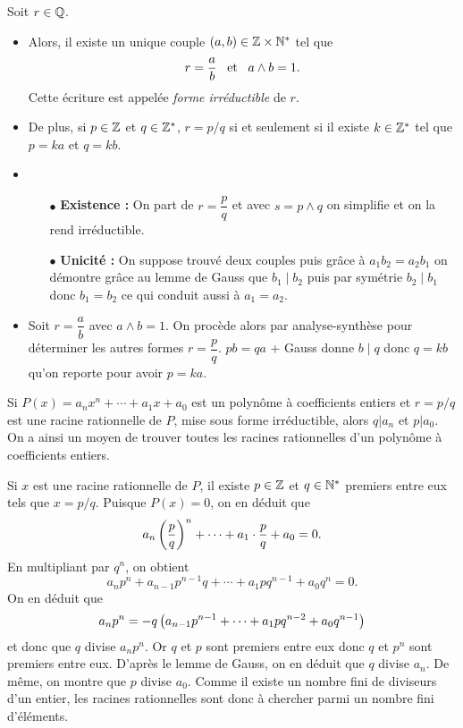 \documentclass{magnolia}
\begin{document}
\begin{proposition}
Soit $r\in\mathbb{Q}$.
\begin{itemize}
\item Alors, il existe un unique couple $\left(a,b\right)\in\mathbb{Z}\times{\mathbb{N}^*}$ tel que
  \[r=\frac{a}{b} \quad\!\text{et}\quad\! a\wedge b=1.\]
  Cette écriture est appelée \emph{forme irréductible} de $r$.
\item De plus, si $p\in\mathbb{Z}$ et $q\in\mathbb{Z}^*$, $r=p/q$ si et seulement si il existe
  $k\in\mathbb{Z}^*$ tel que $p=ka$ et $q=kb$.
\end{itemize}
\end{proposition}

\begin{preuve}
\begin{itemize}
\item \begin{itemize}
\item[$\bullet$] \textbf{Existence :} On part de $r=\dfrac{p}{q}$ et avec $s=p\wedge q$ on simplifie et on la rend irréductible.
\item[$\bullet$] \textbf{Unicité :} On suppose trouvé deux couples puis grâce à $a_1b_2=a_2b_1$ on démontre grâce au lemme de Gauss que $b_1\mid b_2$ puis par symétrie $b_2\mid b_1$ donc $b_1=b_2$ ce qui conduit aussi à $a_1=a_2$.
\end{itemize}
\item Soit $r=\dfrac{a}{b}$ avec $a\wedge b=1$. On procède alors par analyse-synthèse pour déterminer les autres formes $r=\dfrac{p}{q}$. $pb=qa$ + Gauss donne $b\mid q$ donc $q=kb$ qu'on reporte pour avoir $p=ka$.
\end{itemize}

\end{preuve}

\begin{remarqueUnique}
\remarque Si $P(x)=a_n x^n+\cdots+a_1 x+a_0$ est un polynôme à coefficients
  entiers et $r=p/q$ est une racine rationnelle de $P$, mise sous
  forme irréductible, alors $q|a_n$ et $p|a_0$. On a ainsi un moyen de trouver
  toutes les racines rationnelles d'un polynôme à coefficients entiers.
\end{remarqueUnique}

\begin{sol}
Si $x$ est une racine rationnelle de $P$, il existe $p\in\mathbb{Z}$ et $q\in{\mathbb{N}^*}$ premiers entre eux tels que $x=p/q$. Puisque $P(x)=0$, on en déduit que
\[a_n\left(\frac{p}{q}\right)^n+\cdots+a_1\cdot\frac{p}{q}+a_0=0.\]
En multipliant par $q^n$, on obtient
\[a_n p^n + a_{n-1}p^{n-1}q+\cdots+a_1 p q^{n-1}+a_0 q^n=0.\]
On en déduit que
\[a_n p^n = -q\left(a_{n-1}p^{n-1}+\cdots+a_1 p q^{n-2}+a_0 q^{n-1}\right)\]
et donc que $q$ divise $a_n p^n$. Or $q$ et $p$ sont premiers entre eux donc $q$ et $p^n$ sont premiers entre eux. D'après le lemme de {\sc Gauss}, on en déduit que $q$ divise $a_n$. De même, on montre que $p$ divise $a_0$. Comme il existe un nombre fini de diviseurs d'un entier, les racines rationnelles sont donc à chercher parmi un nombre fini d'éléments.
\end{sol}
\end{document}

